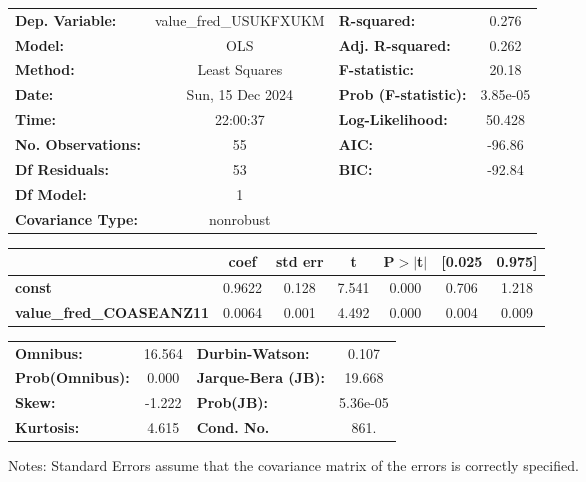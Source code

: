 \begin{center}
\begin{tabular}{lclc}
\toprule
\textbf{Dep. Variable:}          & value\_fred\_USUKFXUKM & \textbf{  R-squared:         } &     0.276   \\
\textbf{Model:}                  &          OLS           & \textbf{  Adj. R-squared:    } &     0.262   \\
\textbf{Method:}                 &     Least Squares      & \textbf{  F-statistic:       } &     20.18   \\
\textbf{Date:}                   &    Sun, 15 Dec 2024    & \textbf{  Prob (F-statistic):} &  3.85e-05   \\
\textbf{Time:}                   &        22:00:37        & \textbf{  Log-Likelihood:    } &    50.428   \\
\textbf{No. Observations:}       &             55         & \textbf{  AIC:               } &    -96.86   \\
\textbf{Df Residuals:}           &             53         & \textbf{  BIC:               } &    -92.84   \\
\textbf{Df Model:}               &              1         & \textbf{                     } &             \\
\textbf{Covariance Type:}        &       nonrobust        & \textbf{                     } &             \\
\bottomrule
\end{tabular}
\begin{tabular}{lcccccc}
                                 & \textbf{coef} & \textbf{std err} & \textbf{t} & \textbf{P$> |$t$|$} & \textbf{[0.025} & \textbf{0.975]}  \\
\midrule
\textbf{const}                   &       0.9622  &        0.128     &     7.541  &         0.000        &        0.706    &        1.218     \\
\textbf{value\_fred\_COASEANZ11} &       0.0064  &        0.001     &     4.492  &         0.000        &        0.004    &        0.009     \\
\bottomrule
\end{tabular}
\begin{tabular}{lclc}
\textbf{Omnibus:}       & 16.564 & \textbf{  Durbin-Watson:     } &    0.107  \\
\textbf{Prob(Omnibus):} &  0.000 & \textbf{  Jarque-Bera (JB):  } &   19.668  \\
\textbf{Skew:}          & -1.222 & \textbf{  Prob(JB):          } & 5.36e-05  \\
\textbf{Kurtosis:}      &  4.615 & \textbf{  Cond. No.          } &     861.  \\
\bottomrule
\end{tabular}
\end{center}

Notes: \newline
 [1] Standard Errors assume that the covariance matrix of the errors is correctly specified.